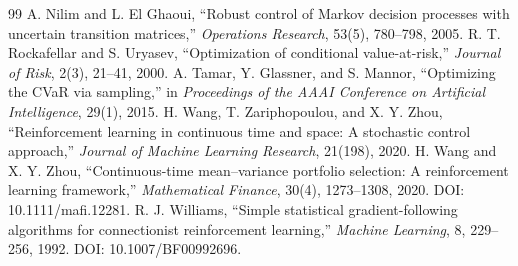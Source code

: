 \documentclass[11pt]{article}
\begin{document}
\begin{thebibliography}{99}
 A. Nilim and L. El Ghaoui, ``Robust control of Markov decision processes with uncertain transition matrices,'' \emph{Operations Research}, 53(5), 780--798, 2005.
 R. T. Rockafellar and S. Uryasev, ``Optimization of conditional value-at-risk,'' \emph{Journal of Risk}, 2(3), 21--41, 2000.
 A. Tamar, Y. Glassner, and S. Mannor, ``Optimizing the CVaR via sampling,'' in \emph{Proceedings of the AAAI Conference on Artificial Intelligence}, 29(1), 2015.
 H. Wang, T. Zariphopoulou, and X. Y. Zhou, ``Reinforcement learning in continuous time and space: A stochastic control approach,'' \emph{Journal of Machine Learning Research}, 21(198), 2020.
 H. Wang and X. Y. Zhou, ``Continuous-time mean--variance portfolio selection: A reinforcement learning framework,'' \emph{Mathematical Finance}, 30(4), 1273--1308, 2020. DOI: 10.1111/mafi.12281.
 R. J. Williams, ``Simple statistical gradient-following algorithms for connectionist reinforcement learning,'' \emph{Machine Learning}, 8, 229--256, 1992. DOI: 10.1007/BF00992696.
\end{thebibliography}
\end{document}
